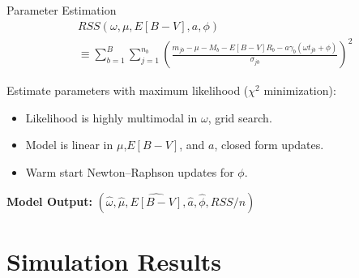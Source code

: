 \documentclass[12pt]{beamer}
\begin{document}
\begin{frame}{Parameter Estimation}
\begin{align*}
&RSS(\omega,\mu,E[B-V],a,\phi) \\
 &\equiv\sum_{b=1}^B \sum_{j=1}^{n_b}\left(\frac{m_{jb} - \mu - M_b - E[B-V]R_b - a\gamma_b(\omega t_{jb} + \phi)}{\sigma_{jb}}\right)^2
\end{align*}


Estimate parameters with maximum likelihood ($\chi^2$ minimization):
\begin{itemize}
\item Likelihood is highly multimodal in $\omega$, grid search.
\item Model is linear in $\mu$,$E[B-V]$, and $a$, closed form updates.
\item Warm start Newton--Raphson updates for $\phi$.
\end{itemize}

\vspace{.2in}

\begin{center}
  \textbf{Model Output:} $(\widehat{\omega},\widehat{\mu},\widehat{E[B-V]},\widehat{a},\widehat{\phi},RSS/n)$
\end{center}

\end{frame}

\section{Simulation Results}
\end{document}
